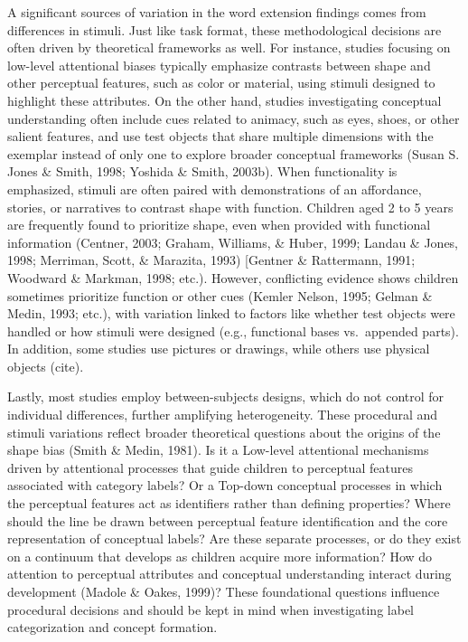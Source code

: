 \documentclass[10pt, letterpaper]{article}
\begin{document}
A significant sources of variation in the word extension findings comes
from differences in stimuli. Just like task format, these methodological
decisions are often driven by theoretical frameworks as well. For
instance, studies focusing on low-level attentional biases typically
emphasize contrasts between shape and other perceptual features, such as
color or material, using stimuli designed to highlight these attributes.
On the other hand, studies investigating conceptual understanding often
include cues related to animacy, such as eyes, shoes, or other salient
features, and use test objects that share multiple dimensions with the
exemplar instead of only one to explore broader conceptual frameworks
(Susan S. Jones \& Smith, 1998; Yoshida \& Smith, 2003b). When
functionality is emphasized, stimuli are often paired with
demonstrations of an affordance, stories, or narratives to contrast
shape with function. Children aged 2 to 5 years are frequently found to
prioritize shape, even when provided with functional information
(Centner, 2003; Graham, Williams, \& Huber, 1999; Landau \& Jones, 1998;
Merriman, Scott, \& Marazita, 1993) {[}Gentner \& Rattermann, 1991;
Woodward \& Markman, 1998; etc.). However, conflicting evidence shows
children sometimes prioritize function or other cues (Kemler Nelson,
1995; Gelman \& Medin, 1993; etc.), with variation linked to factors
like whether test objects were handled or how stimuli were designed
(e.g., functional bases vs.~appended parts). In addition, some studies
use pictures or drawings, while others use physical objects (cite).

Lastly, most studies employ between-subjects designs, which do not
control for individual differences, further amplifying heterogeneity.
These procedural and stimuli variations reflect broader theoretical
questions about the origins of the shape bias (Smith \& Medin, 1981). Is
it a Low-level attentional mechanisms driven by attentional processes
that guide children to perceptual features associated with category
labels? Or a Top-down conceptual processes in which the perceptual
features act as identifiers rather than defining properties? Where
should the line be drawn between perceptual feature identification and
the core representation of conceptual labels? Are these separate
processes, or do they exist on a continuum that develops as children
acquire more information? How do attention to perceptual attributes and
conceptual understanding interact during development (Madole \& Oakes,
1999)? These foundational questions influence procedural decisions and
should be kept in mind when investigating label categorization and
concept formation.
\end{document}
